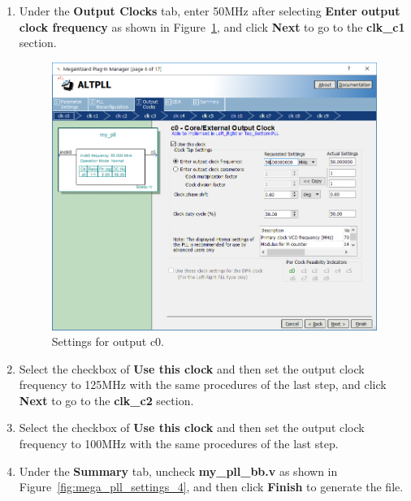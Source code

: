 \documentclass[11pt, twoside, pdftex]{article}
\begin{document}
\begin{enumerate}
	\item Under the {\bf Output Clocks} tab, enter 50MHz after selecting {\bf Enter output clock frequency} as shown in Figure~\ref{fig:mega_pll_settings_3}, and click {\bf Next} to go to the {\bf clk\_c1} section.

\begin{figure}[H]
	\centering
	  \includegraphics[scale=0.65]{figures/mega_pll_settings_3.png}
	\caption{Settings for output c0.} 
	\label{fig:mega_pll_settings_3}
\end{figure}

	\item Select the checkbox of {\bf Use this clock} and then set the output clock frequency to 125MHz with the same procedures of the last step, and click {\bf Next} to go to the {\bf clk\_c2} section.
	\item Select the checkbox of {\bf Use this clock} and then set the output clock frequency to 100MHz with the same procedures of the last step.
	\item Under the {\bf Summary} tab, uncheck {\bf my\_pll\_bb.v} as shown in Figure~\ref{fig:mega_pll_settings_4}, and then click {\bf Finish} to generate the file.
	

\end{enumerate}
\end{document}
